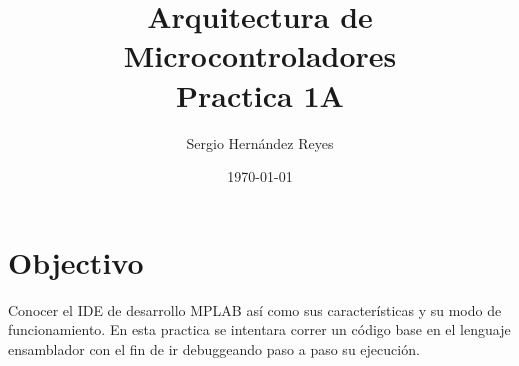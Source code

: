 \documentclass{article}
\title{Arquitectura de Microcontroladores \\ Practica 1A} %
\author{Sergio Hernández Reyes} %
\date{\today} %
\begin{document}
\maketitle %



\section{Objectivo}

Conocer el IDE de desarrollo MPLAB así como sus características y su modo de funcionamiento. En esta practica se intentara correr un código base en el lenguaje ensamblador con el fin de ir debuggeando paso a paso su ejecución.



\end{document}
